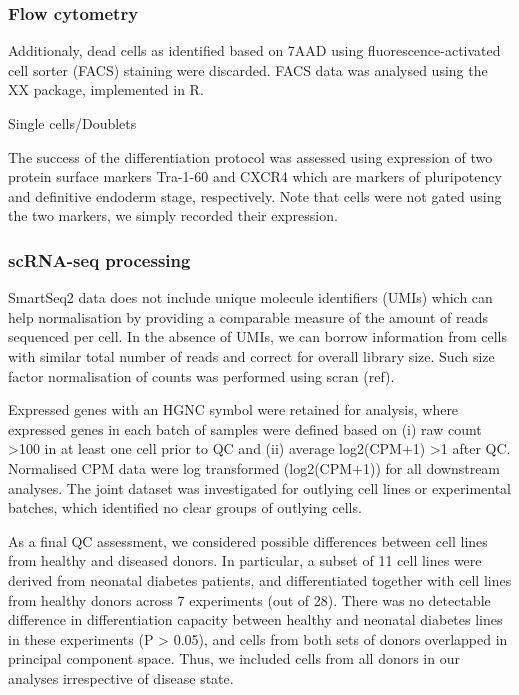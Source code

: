 \subsubsection{Flow cytometry}

Additionaly, dead cells as identified based on 7AAD using fluorescence-activated cell sorter (FACS) staining were discarded. 
FACS data was analysed using the XX package, implemented in R. 

Single cells/Doublets

The success of the differentiation protocol was assessed using expression of two protein surface markers Tra-1-60 and CXCR4 which are markers of pluripotency and definitive endoderm stage, respectively. 
Note that cells were not gated using the two markers, we simply recorded their expression.

\subsubsection{scRNA-seq processing}

SmartSeq2 data does not include unique molecule identifiers (UMIs) which can help normalisation by providing a comparable measure of the amount of reads sequenced per cell. 
In the absence of UMIs, we can borrow information from cells with similar total number of reads and correct for overall library size. 
Such size factor normalisation of counts was performed using scran (ref). 

Expressed genes with an HGNC symbol were retained for analysis, where expressed genes in each batch of samples were defined based on (i) raw count >100 in at least one cell prior to QC and (ii) average log2(CPM+1) >1 after QC. 
Normalised CPM data were log transformed (log2(CPM+1)) for all downstream analyses. 
The joint dataset was investigated for outlying cell lines or experimental batches, which identified no clear groups of outlying cells. 

As a final QC assessment, we considered possible differences between cell lines from healthy and diseased donors. 
In particular, a subset of 11 cell lines were derived from neonatal diabetes patients, and differentiated together with cell lines from healthy donors across 7 experiments (out of 28). 
There was no detectable difference in differentiation capacity between healthy and neonatal diabetes lines in these experiments (P > 0.05), and cells from both sets of donors overlapped in principal component space. 
Thus, we included cells from all donors in our analyses irrespective of disease state.

